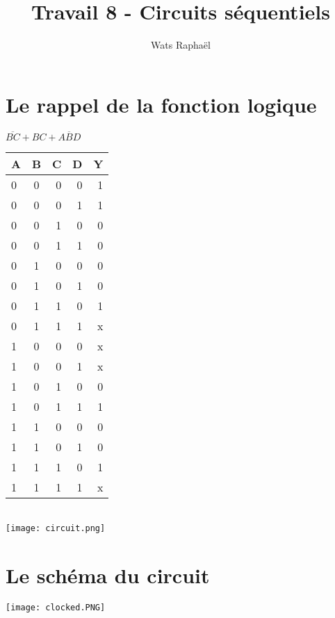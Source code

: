 \documentclass{homeworg}
\title{Travail 8 - Circuits séquentiels}
\author{Wats Raphaël}
\begin{document}
\maketitle

\section{Le rappel de la fonction logique}
\begin{center}
    \huge
    $\overline{BC} + BC + A\overline{B}D$
\end{center}
\begin{center}
    \begin{tabular}{|l|c|r|r|r|}
        \hline
            A & B & C & D & Y\\
        \hline
            0 & 0 & 0 & 0 & 1\\
            0 & 0 & 0 & 1 & 1\\
            0 & 0 & 1 & 0 & 0\\
            0 & 0 & 1 & 1 & 0\\
            0 & 1 & 0 & 0 & 0\\
            0 & 1 & 0 & 1 & 0\\
            0 & 1 & 1 & 0 & 1\\
            0 & 1 & 1 & 1 & x\\
            1 & 0 & 0 & 0 & x\\
            1 & 0 & 0 & 1 & x\\
            1 & 0 & 1 & 0 & 0\\
            1 & 0 & 1 & 1 & 1\\
            1 & 1 & 0 & 0 & 0\\
            1 & 1 & 0 & 1 & 0\\
            1 & 1 & 1 & 0 & 1\\
            1 & 1 & 1 & 1 & x\\
        \hline
    \end{tabular}\\
    \texttt{[image: circuit.png]}
\end{center}
\newpage

\section{Le schéma du circuit}
\begin{center}
    \texttt{[image: clocked.PNG]}\\
\end{center}
\end{document}
